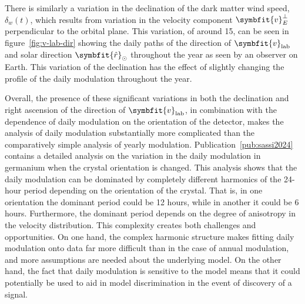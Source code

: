\documentclass[b5paper, 10pt, twoside]{book}
\renewcommand{\vec}[1]{\symbfit{#1}}
\newcommand{\unitv}[1]{\symbfit{\hat{#1}}}
\begin{document}
There is similarly a variation in the declination of the dark matter wind speed, $\delta_w(t)$, which results from variation in the velocity component $\vec{v}_E^\perp$ perpendicular to the orbital plane. This variation, of around 15\degree{}, can be seen in figure~\ref{fig:v-lab-dir} showing the daily paths of the direction of $\vec{v}_\text{lab}$ and solar direction $\unitv{r}_\odot$ throughout the year as seen by an observer on Earth. This variation of the declination has the effect of slightly changing the profile of the daily modulation throughout the year.

Overall, the presence of these significant variations in both the declination and right ascension of the direction of $\vec{v}_\text{lab}$, in combination with the dependence of daily modulation on the orientation of the detector, makes the analysis of daily modulation substantially more complicated than the comparatively simple analysis of yearly modulation. Publication~\ref{pub:sassi2024} contains a detailed analysis on the variation in the daily modulation in germanium when the crystal orientation is changed. This analysis shows that the daily modulation can be dominated by completely different harmonics of the 24-hour period depending on the orientation of the crystal. That is, in one orientation the dominant period could be 12 hours, while in another it could be 6 hours. Furthermore, the dominant period depends on the degree of anisotropy in the velocity distribution. This complexity creates both challenges and opportunities. On one hand, the complex harmonic structure makes fitting daily modulation onto data far more difficult than in the case of annual modulation, and more assumptions are needed about the underlying model. On the other hand, the fact that daily modulation is sensitive to the model means that it could potentially be used to aid in model discrimination in the event of discovery of a signal.
\end{document}

